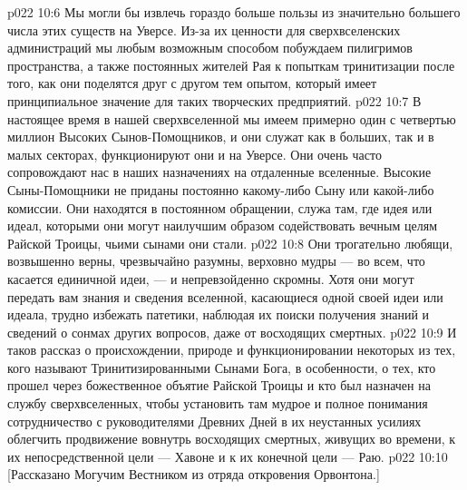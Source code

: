 \vs p022 10:6 Мы могли бы извлечь гораздо больше пользы из значительно большего числа этих существ на Уверсе. Из\hyp{}за их ценности для сверхвселенских администраций мы любым возможным способом побуждаем пилигримов пространства, а также постоянных жителей Рая к попыткам тринитизации после того, как они поделятся друг с другом тем опытом, который имеет принципиальное значение для таких творческих предприятий.
\vs p022 10:7 \pc В настоящее время в нашей сверхвселенной мы имеем примерно один с четвертью миллион Высоких Сынов\hyp{}Помощников, и они служат как в больших, так и в малых секторах, функционируют они и на Уверсе. Они очень часто сопровождают нас в наших назначениях на отдаленные вселенные. Высокие Сыны\hyp{}Помощники не приданы постоянно какому\hyp{}либо Сыну или какой\hyp{}либо комиссии. Они находятся в постоянном обращении, служа там, где идея или идеал, которыми они  могут наилучшим образом содействовать вечным целям Райской Троицы, чьими сынами они стали.
\vs p022 10:8 Они трогательно любящи, возвышенно верны, чрезвычайно разумны, верховно мудры --- во всем, что касается единичной идеи, --- и непревзойденно скромны. Хотя они могут передать вам знания и сведения вселенной, касающиеся одной своей идеи или идеала, трудно избежать патетики, наблюдая их поиски получения знаний и сведений о сонмах других вопросов, даже от восходящих смертных.
\vs p022 10:9 \pc И таков рассказ о происхождении, природе и функционировании некоторых из тех, кого называют Тринитизированными Сынами Бога, в особенности, о тех, кто прошел через божественное объятие Райской Троицы и кто был назначен на службу сверхвселенных, чтобы установить там мудрое и полное понимания сотрудничество с руководителями Древних Дней в их неустанных усилиях облегчить продвижение вовнутрь восходящих смертных, живущих во времени, к их непосредственной цели --- Хавоне и к их конечной цели --- Раю.
\vsetoff
\vs p022 10:10 [Рассказано Могучим Вестником из отряда откровения Орвонтона.]
